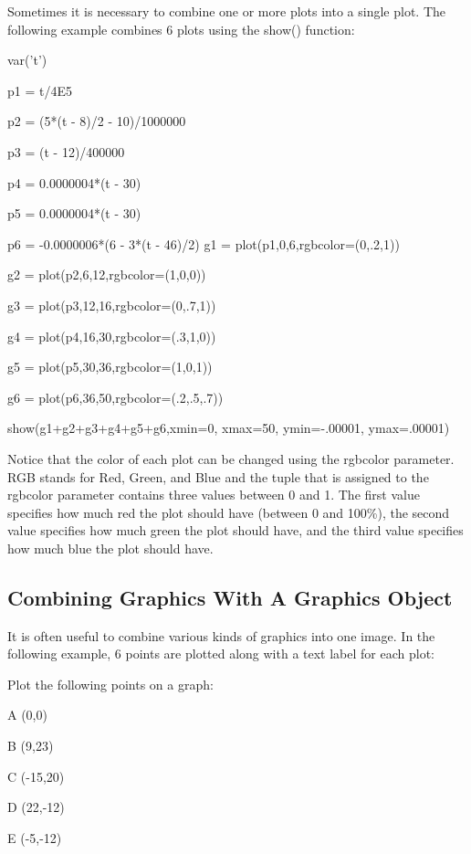 \documentclass[12pt,oneside]{book}
\begin{document}
Sometimes it is necessary to combine one or more plots into a single plot. The following example combines 6 plots using the show() function: 

var('t')

p1 = t/4E5

p2 = (5*(t {}- 8)/2 {}- 10)/1000000

p3 = (t {}- 12)/400000

p4 = 0.0000004*(t {}- 30)

p5 = 0.0000004*(t {}- 30)

p6 = {}-0.0000006*(6 {}- 3*(t {}- 46)/2)
g1 = plot(p1,0,6,rgbcolor=(0,.2,1))

g2 = plot(p2,6,12,rgbcolor=(1,0,0))

g3 = plot(p3,12,16,rgbcolor=(0,.7,1))

g4 = plot(p4,16,30,rgbcolor=(.3,1,0))

g5 = plot(p5,30,36,rgbcolor=(1,0,1))

g6 = plot(p6,36,50,rgbcolor=(.2,.5,.7))


show(g1+g2+g3+g4+g5+g6,xmin=0, xmax=50, ymin={}-.00001, ymax=.00001)

{\textbar}


Notice that the color of each plot can be changed using the rgbcolor parameter. RGB stands for Red, Green, and Blue and the tuple that is assigned to the rgbcolor parameter contains three values between 0 and 1. The first value specifies how much red the plot should have (between 0 and 100\%), the second value specifies how much green the plot should have, and the third value specifies how much blue the plot should have.

\subsection[Combining Graphics With A Graphics Object]{Combining Graphics With A Graphics Object}

It is often useful to combine various kinds of graphics into one image. In the following example, 6 points are plotted along with a text label for each plot:

{\textquotedbl}{\textquotedbl}{\textquotedbl}

Plot the following points on a graph:


A (0,0)

B (9,23)

C ({}-15,20)

D (22,{}-12)

E ({}-5,{}-12)
\end{document}
